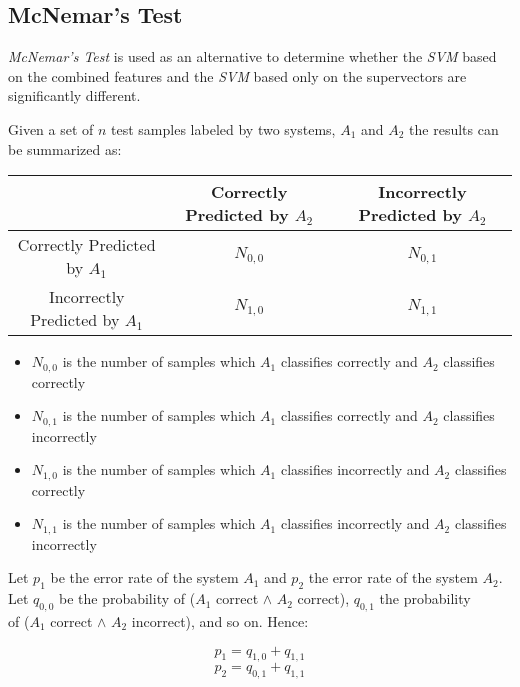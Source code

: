 \subsection{McNemar's Test} \label{subsection:mcnemar}

\textit{McNemar's Test} \cite{mcnemar}
is used as an alternative to determine whether the \textit{SVM}
based on the combined features and the \textit{SVM} based only on the
supervectors are significantly different.

Given a set of $n$ test samples labeled by two systems, $A_{1}$ and $A_{2}$
the results can be summarized as:

\begin{center}
    \begin{tabular}{ | c | c | c | }
    \hline
    & Correctly Predicted by $A_{2}$ & Incorrectly Predicted by $A_{2}$ \\ \hline
    Correctly Predicted by $A_{1}$ & $N_{0,0}$ & $N_{0,1}$ \\ \hline
    Incorrectly Predicted by $A_{1}$ & $N_{1,0}$ & $N_{1,1}$ \\ \hline
    \end{tabular}
\end{center}

\begin{itemize}
\item{$N_{0, 0}$ is the number of samples which $A_{1}$ classifies correctly and $A_{2}$ classifies correctly}
\item{$N_{0, 1}$ is the number of samples which $A_{1}$ classifies correctly and $A_{2}$ classifies incorrectly}
\item{$N_{1, 0}$ is the number of samples which $A_{1}$ classifies incorrectly and $A_{2}$ classifies correctly}
\item{$N_{1, 1}$ is the number of samples which $A_{1}$ classifies incorrectly and $A_{2}$ classifies incorrectly}
\end{itemize}

Let $p_{1}$ be the error rate of the system $A_{1}$ and $p_{2}$ the error rate of the
system $A_{2}$. \\
Let $q_{0,0}$ be the probability of ($A_{1}$ correct $\land$ $A_{2}$ correct),
$q_{0,1}$ the probability \\ of ($A_{1}$ correct $\land$ $A_{2}$ incorrect), and so on. Hence:

\begin{multicols}{2}
  \noindent
  \begin{equation}
    p_{1} = q_{1,0} + q_{1,1}
  \end{equation}
  \begin{equation}
    p_{2} = q_{0,1} + q_{1,1}
  \end{equation}
\end{multicols}

